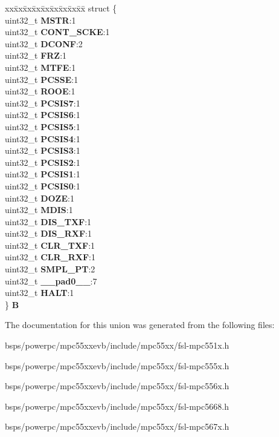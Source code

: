 \begin{DoxyCompactItemize}
\begin{tabbing}
\end{tabbing}\item 
\mbox{\label{unionDSPI__tag_1_1DSPI__MCR__tag_a6518769769ebe2c485a8b435ec6bb8c5}} 
\begin{tabbing}
xx\=xx\=xx\=xx\=xx\=xx\=xx\=xx\=xx\=\kill
struct \{\\
\>uint32\_t {\bfseries MSTR}:1\\
\>uint32\_t {\bfseries CONT\_SCKE}:1\\
\>uint32\_t {\bfseries DCONF}:2\\
\>uint32\_t {\bfseries FRZ}:1\\
\>uint32\_t {\bfseries MTFE}:1\\
\>uint32\_t {\bfseries PCSSE}:1\\
\>uint32\_t {\bfseries ROOE}:1\\
\>uint32\_t {\bfseries PCSIS7}:1\\
\>uint32\_t {\bfseries PCSIS6}:1\\
\>uint32\_t {\bfseries PCSIS5}:1\\
\>uint32\_t {\bfseries PCSIS4}:1\\
\>uint32\_t {\bfseries PCSIS3}:1\\
\>uint32\_t {\bfseries PCSIS2}:1\\
\>uint32\_t {\bfseries PCSIS1}:1\\
\>uint32\_t {\bfseries PCSIS0}:1\\
\>uint32\_t {\bfseries DOZE}:1\\
\>uint32\_t {\bfseries MDIS}:1\\
\>uint32\_t {\bfseries DIS\_TXF}:1\\
\>uint32\_t {\bfseries DIS\_RXF}:1\\
\>uint32\_t {\bfseries CLR\_TXF}:1\\
\>uint32\_t {\bfseries CLR\_RXF}:1\\
\>uint32\_t {\bfseries SMPL\_PT}:2\\
\>uint32\_t {\bfseries \_\_pad0\_\_}:7\\
\>uint32\_t {\bfseries HALT}:1\\
\} {\bfseries B}\\

\end{tabbing}\end{DoxyCompactItemize}


The documentation for this union was generated from the following files\+:\begin{DoxyCompactItemize}
\item 
bsps/powerpc/mpc55xxevb/include/mpc55xx/fsl-\/mpc551x.\+h\item 
bsps/powerpc/mpc55xxevb/include/mpc55xx/fsl-\/mpc555x.\+h\item 
bsps/powerpc/mpc55xxevb/include/mpc55xx/fsl-\/mpc556x.\+h\item 
bsps/powerpc/mpc55xxevb/include/mpc55xx/fsl-\/mpc5668.\+h\item 
bsps/powerpc/mpc55xxevb/include/mpc55xx/fsl-\/mpc567x.\+h\end{DoxyCompactItemize}
